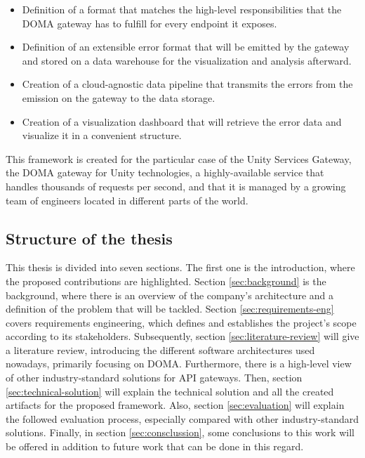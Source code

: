 \documentclass[english, 12pt, a4paper, sci, utf8, a-1b, online]{aaltothesis}
\begin{document}
\begin{itemize}
    \item Definition of a format that matches the high-level responsibilities that the DOMA gateway has to fulfill for every endpoint it exposes.
    \item Definition of an extensible error format that will be emitted by the gateway and stored on a data warehouse for the visualization and analysis afterward.
    \item Creation of a cloud-agnostic data pipeline that transmits the errors from the emission on the gateway to the data storage.
    \item Creation of a visualization dashboard that will retrieve the error data and visualize it in a convenient structure.
\end{itemize}

This framework is created for the particular case of the Unity Services Gateway, the DOMA gateway for Unity technologies, a highly-available service that handles thousands of requests per second, and that it is managed by a growing team of engineers located in different parts of the world.

\subsection{Structure of the thesis}

This thesis is divided into seven sections. The first one is the introduction, where the proposed contributions are highlighted. Section \ref{sec:background} is the background, where there is an overview of the company's architecture and a definition of the problem that will be tackled. Section \ref{sec:requirements-eng} covers requirements engineering, which defines and establishes the project's scope according to its stakeholders. Subsequently, section \ref{sec:literature-review} will give a literature review, introducing the different software architectures used nowadays, primarily focusing on DOMA. Furthermore, there is a high-level view of other industry-standard solutions for API gateways. Then, section \ref{sec:technical-solution} will explain the technical solution and all the created artifacts for the proposed framework. Also, section \ref{sec:evaluation} will explain the followed evaluation process, especially compared with other industry-standard solutions. Finally, in section \ref{sec:consclussion}, some conclusions to this work will be offered in addition to future work that can be done in this regard.
\end{document}
